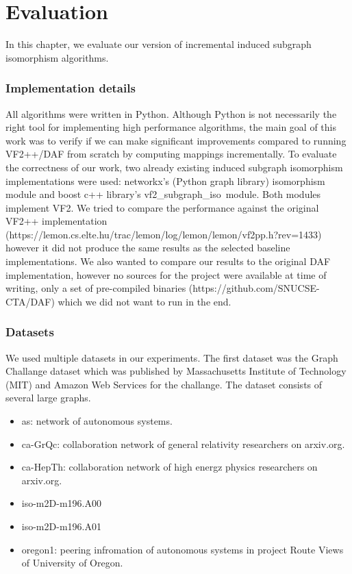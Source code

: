 \chapter{Evaluation}

In this chapter, we evaluate our version of incremental induced subgraph isomorphism algorithms.

\subsection{Implementation details}

All algorithms were written in Python. Although Python is not necessarily the right tool 
for implementing high performance algorithms, the main goal of this work was to verify if
we can make significant improvements compared to running VF2++/DAF from scratch by computing
mappings incrementally. To evaluate the correctness of our work, two already existing induced 
subgraph isomorphism implementations were used: networkx's (Python graph library) isomorphism 
module and boost c++ library's vf2\_subgraph\_iso\ module. Both modules implement VF2. We 
tried to compare the performance against the original VF2++ implementation (https://lemon.cs.elte.hu/trac/lemon/log/lemon/lemon/vf2pp.h?rev=1433)
however it did not produce the same results as the selected baseline implementations. We also
wanted to compare our results to the original DAF implementation, however no sources for the
project were available at time of writing, only a set of pre-compiled binaries (https://github.com/SNUCSE-CTA/DAF)
which we did not want to run in the end.

\subsection{Datasets}

We used multiple datasets in our experiments. The first dataset was the Graph Challange dataset
which was published by Massachusetts Institute of Technology (MIT) and Amazon Web Services for
the challange. The dataset consists of several large graphs. 

\begin{itemize}
    \item as: network of autonomous systems.
    \item ca-GrQc: collaboration network of general relativity researchers on arxiv.org.
    \item ca-HepTh: collaboration network of high energz physics researchers on arxiv.org.
    \item iso-m2D-m196.A00
    \item iso-m2D-m196.A01
    \item oregon1: peering infromation of autonomous systems in project Route Views of University of Oregon.
\end{itemize}

